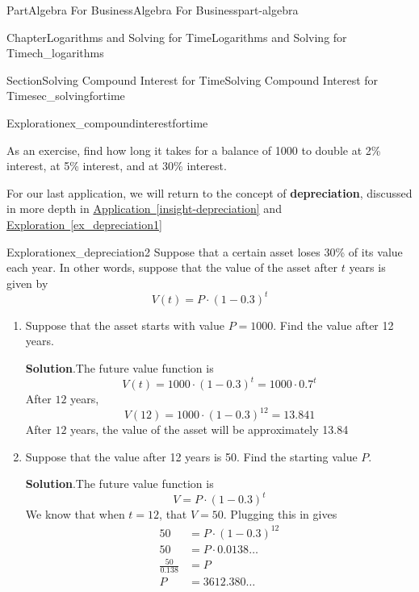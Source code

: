 \documentclass{tufte-book}
\newcommand{\blocktitlefont}{\relax}
\newcommand{\xreffont}{\relax}
\newcommand{\terminology}[1]{\textbf{#1}}
\numberwithin{equation}{chapter}
\newcommand{\amp}{&}
\begin{document}
\begin{partptx}{Part}{Algebra For Business}{}{Algebra For Business}{}{}{part-algebra}
\begin{chapterptx}{Chapter}{Logarithms and Solving for Time}{}{Logarithms and Solving for Time}{}{}{ch_logarithms}
\begin{sectionptx}{Section}{Solving Compound Interest for Time}{}{Solving Compound Interest for Time}{}{}{sec_solvingfortime}
\begin{exploration}{Exploration}{}{ex_compoundinterestfortime}
\begin{enumerate}[font=\bfseries,label=(\alph*),ref=\alph*]
\end{enumerate}%
\end{exploration}%
As an exercise, find how long it takes for a balance of \textdollar{}1000 to double at 2\% interest, at 5\% interest, and at 30\% interest.%
\par
For our last application, we will return to the concept of \terminology{depreciation}, discussed in more depth in \hyperref[insight-depreciation]{Application~{\xreffont\ref{insight-depreciation}}} and \hyperref[ex_depreciation1]{Exploration~{\xreffont\ref{ex_depreciation1}}}%
\begin{exploration}{Exploration}{}{ex_depreciation2}%
Suppose that a certain asset loses 30\% of its value each year. In other words, suppose that the value of the asset after \(t\) years is given by%
\begin{equation*}
V(t) = P\cdot (1-0.3)^t
\end{equation*}
%
\begin{enumerate}[font=\bfseries,label=(\alph*),ref=\alph*]%
\item{}Suppose that  the asset starts with value \(P=1000\). Find the value after 12 years.%
\par\smallskip%
\noindent\textbf{\blocktitlefont Solution}.\hypertarget{ex_depreciation2-2-2}{}\quad{}The future value function is%
\begin{equation*}
V(t) = 1000 \cdot (1-0.3)^t = 1000\cdot 0.7^t
\end{equation*}
After \(12\) years,%
\begin{equation*}
V(12) = 1000 \cdot (1-0.3)^{12} = 13.841
\end{equation*}
After \(12\) years, the value of the asset will be approximately \textdollar{}13.84%
\item{}Suppose that the value after 12 years is \textdollar{}50.  Find the starting value \(P\).%
\par\smallskip%
\noindent\textbf{\blocktitlefont Solution}.\hypertarget{ex_depreciation2-3-2}{}\quad{}The future value function is%
\begin{equation*}
V = P \cdot (1-0.3)^t 
\end{equation*}
We know that when \(t=12\), that \(V=50\).  Plugging this in gives%
\begin{align*}
50 \amp = P \cdot (1-0.3)^{12}\\
50 \amp = P \cdot 0.0138\dots\\
\frac{50}{0.138} \amp = P\\
P \amp = 3612.380\dots
\end{align*}

\end{enumerate}
\end{exploration}
\end{sectionptx}
\end{chapterptx}
\end{partptx}
\end{document}
